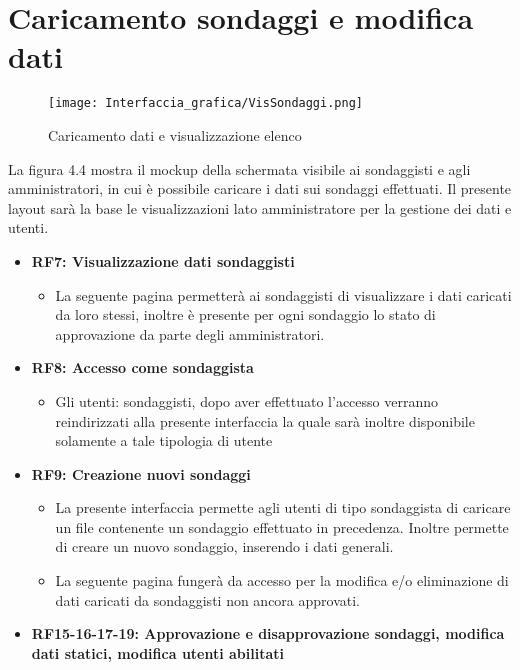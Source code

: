 \section{Caricamento sondaggi e modifica dati}
    \label{fig:4.4}
    \begin{figure}[H]
        \center
        \texttt{[image: Interfaccia\_grafica/VisSondaggi.png]}
        \caption{Caricamento dati e visualizzazione elenco}
    \end{figure} 
    La figura 4.4 mostra il mockup della schermata visibile ai sondaggisti e agli amministratori, in cui è possibile caricare i dati sui sondaggi effettuati.\newline
    Il presente layout sarà la base le visualizzazioni lato amministratore per la gestione dei dati e utenti.
    \begin{itemize}
        \item \textbf{RF7: Visualizzazione dati sondaggisti} \begin{itemize}
            \item La seguente pagina permetterà ai sondaggisti di visualizzare i dati caricati da loro stessi, inoltre è presente per ogni sondaggio lo stato di approvazione da parte degli amministratori.
        \end{itemize}
        \item \textbf{RF8: Accesso come sondaggista} \begin{itemize}
            \item Gli utenti: sondaggisti, dopo aver effettuato l'accesso verranno reindirizzati alla presente interfaccia la quale sarà inoltre disponibile solamente a tale tipologia di utente
        \end{itemize}
        \item \textbf{RF9: Creazione nuovi sondaggi} \begin{itemize}
            \item La presente interfaccia permette agli utenti di tipo sondaggista di caricare un file contenente un sondaggio effettuato in precedenza. Inoltre permette di creare un nuovo sondaggio, inserendo i dati generali.
            \item La seguente pagina fungerà da accesso per la modifica e/o eliminazione di dati caricati da sondaggisti non ancora approvati.
        \end{itemize}
        \item \textbf{RF15-16-17-19: Approvazione e disapprovazione sondaggi, modifica dati statici, modifica utenti abilitati} \begin{itemize}

\end{itemize}
\end{itemize}
